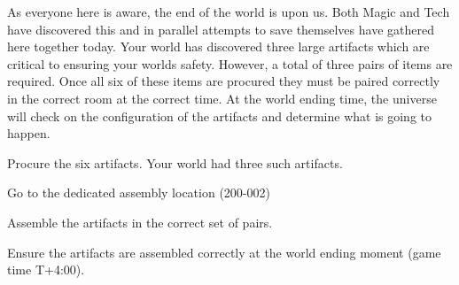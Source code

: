 \documentclass[green]{guildcamp3}
\begin{document}
\name{\gSaveWorld{}}



As everyone here is aware, the end of the world is upon us. Both Magic and Tech have discovered this and in parallel attempts to save themselves have gathered here together today. Your world has discovered three large artifacts which are critical to ensuring your worlds safety. However, a total of three pairs of items are required. Once all six of these items are procured they must be paired correctly in the correct room at the correct time. At the world ending time, the universe will check on the configuration of the artifacts and determine what is going to happen.

\begin{enum}[Directions]
  \item Procure the six artifacts. Your world had three such artifacts.  
  \item Go to the dedicated assembly location (200-002)
  \item Assemble the artifacts in the correct set of pairs.
  \item Ensure the artifacts are assembled correctly at the world ending moment (game time T+4:00). 
\end{enum}
\end{document}
